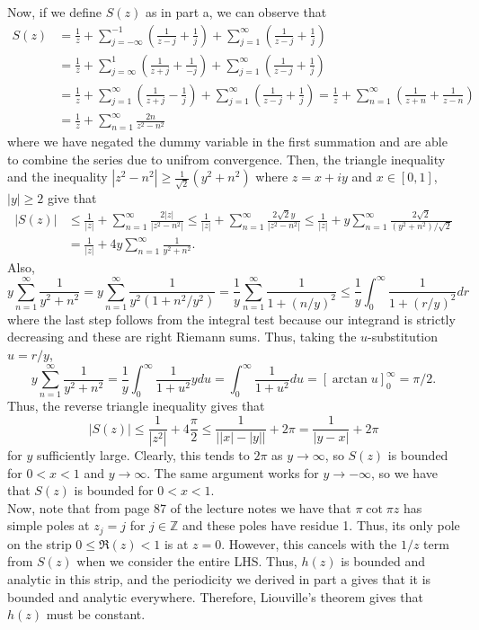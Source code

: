 \documentclass{article}
\begin{document}
Now, if we define $S(z)$ as in part a, we can observe that 
\begin{align*}
S(z)&=\frac{1}{z}+\sum_{j=-\infty}^{-1}\left(\frac{1}{z - j} + \frac{1}{j}\right)+\sum_{j=1}^{\infty}\left(\frac{1}{z - j} + \frac{1}{j}\right)\\&=
\frac{1}{z}+\sum_{j=\infty}^{1}\left(\frac{1}{z + j} + \frac{1}{-j}\right)+\sum_{j=1}^{\infty}\left(\frac{1}{z - j} + \frac{1}{j}\right)\\&=
\frac{1}{z}+\sum_{j=1}^{\infty}\left(\frac{1}{z + j} - \frac{1}{j}\right)+\sum_{j=1}^{\infty}\left(\frac{1}{z - j} + \frac{1}{j}\right)=
\frac{1}{z}+\sum_{n=1}^{\infty}\left(\frac{1}{z + n} + \frac{1}{z-n}\right)\\&=
\frac{1}{z}+\sum_{n=1}^{\infty}\frac{2n}{z^2 - n^2}
\end{align*}
where we have negated the dummy variable in the first summation and are able to combine the series due to unifrom convergence. Then, the triangle inequality and the inequality $|z^2-n^2|\geq \frac{1}{\sqrt{2}}(y^2+n^2)$ where $z=x+iy$ and $x\in [0,1]$, $|y|\geq 2$ give that
\begin{align*}
|S(z)|&\leq \frac{1}{|z|} + \sum_{n=1}^\infty \frac{2|z|}{|z^2 - n^2|}\leq\frac{1}{|z|} + \sum_{n=1}^\infty \frac{2\sqrt2y}{|z^2 - n^2|}\leq\frac{1}{|z|} + y\sum_{n=1}^\infty \frac{2\sqrt2}{(y^2 + n^2)/\sqrt{2}}\\&=\frac{1}{|z|} + 4y\sum_{n=1}^\infty \frac{1}{y^2 + n^2}.
\end{align*}
Also, 
\[
y\sum_{n=1}^\infty \frac{1}{y^2 + n^2}=y\sum_{n=1}^\infty \frac{1}{y^2(1 + n^2/y^2)}=\frac{1}{y}\sum_{n=1}^\infty \frac{1}{1 + (n/y)^2}\leq\frac{1}{y}\int_0^\infty\frac{1}{1+(r/y)^2}dr
\]
where the last step follows from the integral test because our integrand is strictly decreasing and these are right Riemann sums. Thus, taking the $u$-substitution $u=r/y$,
\[
y\sum_{n=1}^\infty \frac{1}{y^2 + n^2}=\frac{1}{y}\int_0^\infty\frac{1}{1+u^2}ydu=\int_0^\infty\frac{1}{1+u^2}du=\left[\arctan u\right]_0^\infty=\pi/2.
\]
Thus, the reverse triangle inequality gives that
\[
|S(z)|\leq\frac{1}{|z^2|}+4\frac{\pi}{2}\leq\frac{1}{\left||x|-|y|\right|}+2\pi=\frac{1}{|y-x|}+2\pi
\]
for $y$ sufficiently large. Clearly, this tends to $2\pi$ as $y\to\infty$, so $S(z)$ is bounded for $0<x<1$ and $y\to\infty$. The same argument works for $y\to-\infty$, so we have that $S(z)$ is bounded for $0<x<1$.\\
Now, note that from page 87 of the lecture notes we have that  $\pi\cot{\pi z}$ has simple poles at $z_j=j$ for $j\in\mathbb{Z}$ and these poles have residue 1. Thus, its only pole on the strip $0\leq\Re(z)<1$ is at $z=0$. However, this cancels with the $1/z$ term from $S(z)$ when we consider the entire LHS. Thus, $h(z)$ is bounded and analytic in this strip, and the periodicity we derived in part a gives that it is bounded and analytic everywhere. Therefore, Liouville's theorem gives that $h(z)$ must be constant.  \\
\end{document}
